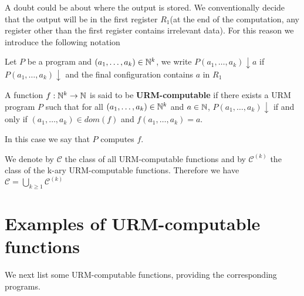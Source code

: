 A doubt could be about where the output is stored. 
We conventionally decide that the output will be in the first register $R_1 $(at the end of the computation, any register other than the first register contains irrelevant data). 
For this reason we introduce the following notation

\begin{notation}
  Let $P$ be a program and $(a_1,\dots,a_k) \in \mathbb{N}^k$, we write
  $P(a_1,\dots,a_k)\downarrow a$ if $P(a_1,\dots,a_k) \downarrow$ and
  the final configuration contains $a$ in $R_1$
\end{notation}

\begin{definition}
  A function $f:\mathbb{N}^k\rightarrow\mathbb{N}$ is said to be
  \textbf{URM-computable} if there exists a URM program $P$ such that for all
  $(a_1,\dots,a_k) \in \mathbb{N}^k$ and $a\in\mathbb{N}$,
  $P(a_1,\dots,a_k)\downarrow$ if and only if $(a_1,\dots,a_k)\in dom(f)$ and
  $f(a_1,\dots,a_k) = a$. 
  
  In this case we say that $P$ computes $f$.

  We denote by $\mathcal{C}$ the class of all URM-computable
  functions and by $\mathcal{C}^{(k)}$ the class of the k-ary
  URM-computable functions.
  Therefore we have
  $\mathcal{C} = \bigcup_{k\geq 1} \mathcal{C}^{(k)}$
\end{definition}

\section{Examples of URM-computable functions}

We next list some URM-computable functions, providing the corresponding programs.

